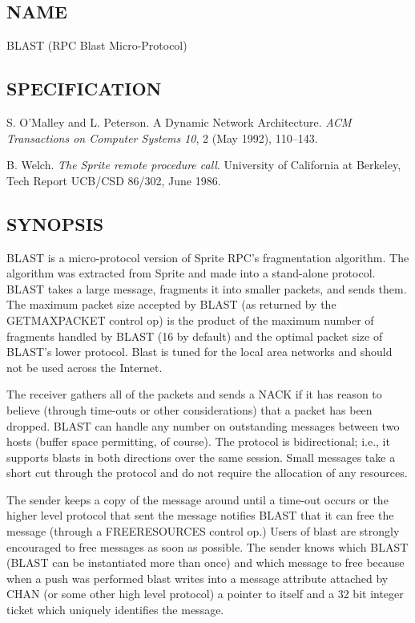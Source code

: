 %
%
%

\subsection*{NAME}

\noindent BLAST (RPC Blast Micro-Protocol)

\subsection*{SPECIFICATION}

\noindent 
S. O'Malley and L. Peterson.  A Dynamic Network Architecture.  {\it
ACM Transactions on Computer Systems 10}, 2 (May 1992), 110--143.

\medskip
\noindent  B. Welch. {\it The Sprite remote procedure call}. 
University of California at Berkeley, Tech Report UCB/CSD 86/302,
June 1986.

\subsection*{SYNOPSIS}

\noindent 
BLAST is a micro-protocol version of Sprite RPC's
fragmentation algorithm. The algorithm was extracted from Sprite and
made into a stand-alone protocol. BLAST takes a large message,
fragments it into smaller packets, and sends them. 
The maximum packet size accepted by BLAST (as returned by the GETMAXPACKET
control op) is the product of the maximum number of fragments handled
by BLAST (16 by default) and the optimal packet size of BLAST's lower
protocol. Blast is tuned for the local area networks and should 
not be used across the Internet. 

The receiver gathers all of the packets and sends a NACK if it has
reason to believe (through time-outs or other considerations) that
a packet has been dropped.
BLAST can handle any
number on outstanding messages between two hosts (buffer space
permitting, of course). The protocol is bidirectional; i.e., it
supports blasts in both directions over the same session. Small
messages take a short cut through the protocol and do not require the
allocation of any resources.  

The sender keeps a copy of the message
around until a time-out occurs or the higher level protocol that sent
the message notifies BLAST that it can free the message (through a
FREERESOURCES control op.) Users of blast are strongly encouraged 
to free messages as soon as possible. The sender knows which 
BLAST (BLAST can be instantiated more than once) and which message
to free because when a push was performed blast writes into a message
attribute attached by CHAN (or some other high level protocol)  a pointer 
to itself and a 32 bit integer ticket which uniquely identifies the message. 

